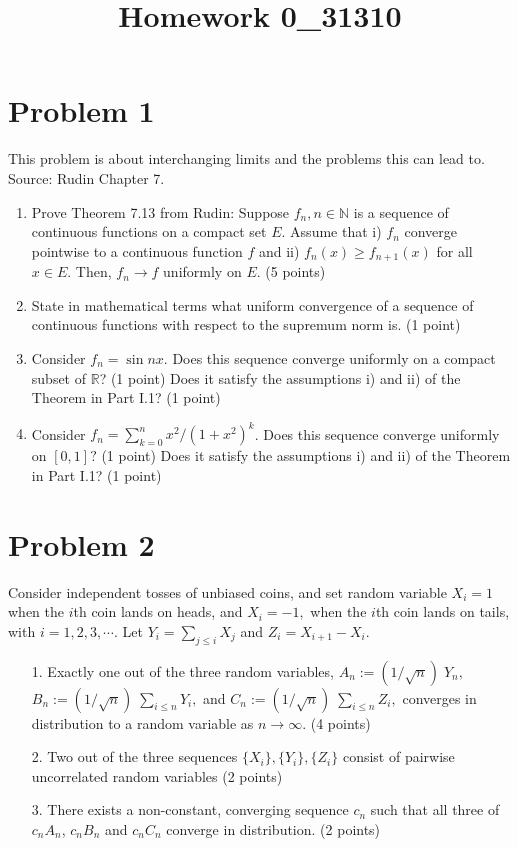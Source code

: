 \documentclass[12pt]{article}
\title{Homework 0_31310}
\begin{document}
\MakeScribeTop

\section*{Problem 1}
This problem is about interchanging limits and the problems this can lead to. Source: Rudin Chapter 7.
\begin{enumerate}
	\item Prove Theorem 7.13 from Rudin: Suppose $f_n, n \in \mathbb{N}$ is a sequence of continuous functions on a compact set $E.$ Assume that i) $f_n$ converge pointwise to a continuous function $f$ and ii) $f_n(x) \geq f_{n+1}(x)$ for all $x \in E.$ Then, $f_n \to f$ uniformly on $E.$
 (5 points)
	\item State in mathematical terms what uniform convergence of a sequence of continuous functions with respect to the supremum norm is. (1 point)
	\item Consider $f_n = \sin nx$. Does this sequence converge uniformly on a compact subset of $\mathbb{R}$? (1 point) Does it satisfy the assumptions i) and ii) of the Theorem in Part I.1? (1 point)
	\item  Consider $f_n = \sum_{k=0}^n x^2/(1+x^2)^k$. Does this sequence converge uniformly on $[0,1]?$ (1 point) Does it satisfy the assumptions i) and ii) of the Theorem in Part I.1? (1 point)

\end{enumerate}

\section*{Problem 2}
Consider independent tosses of unbiased coins, and set random variable 
$X_i = 1$ when the $i$th coin lands 
on heads, and $X_i = -1,$ when the $i$th coin lands on tails, with $i = 1,2,3,\cdots.$ Let $Y_i = \sum_{j\leq i} X_j$ and $Z_i = X_{i+1} - X_i.$  
\begin{itemize}
	\item[1.] Exactly one out of the three random variables, $A_n := (1/\sqrt{n}) \; Y_n,$ $B_n := (1/\sqrt{n})\; \sum_{i\leq n} Y_i,$ and $C_n := (1/\sqrt{n})\; \sum_{i\leq n} Z_i,$ converges in 
	distribution to a random variable as $n \to \infty.$  (4 points)
	\item[2.] Two out of the three sequences $ \{X_i\}, \{Y_i\}, \{Z_i\}$ consist of pairwise uncorrelated random variables (2 points) 
	\item[3.] There exists a non-constant, converging sequence $c_n$ such that all three of $c_n A_n$, $c_n B_n$ and $c_n C_n$ converge in distribution. (2 points)
\end{itemize}
\end{document}
